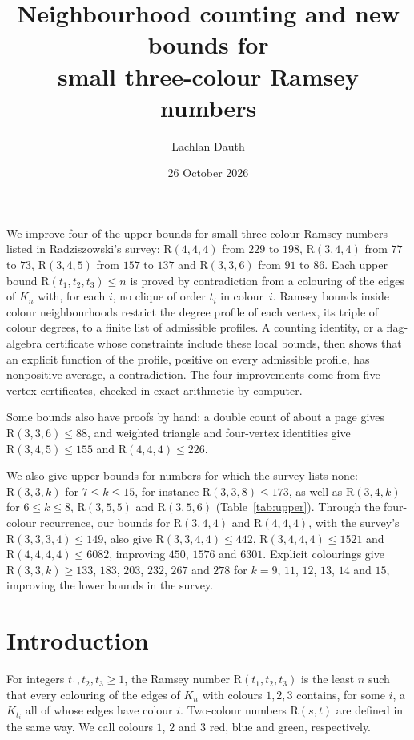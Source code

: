 \documentclass[11pt]{article}
\title{Neighbourhood counting and new bounds for\\ small three-colour Ramsey numbers}
\author{Lachlan Dauth}
\date{26 October 2026}
\renewenvironment{abstract}{\small\begin{center}\bfseries\abstractname\end{center}%
  \list{}{\setlength{\leftmargin}{2.5em}\setlength{\rightmargin}{\leftmargin}%
  \setlength{\listparindent}{0pt}\setlength{\parsep}{0.6em plus 1pt}\setlength{\topsep}{0pt}}\item\relax}{\endlist}
\theoremstyle{spacedplain}
\theoremstyle{spaceddef}
\theoremstyle{spacedremark}
\newcommand{\R}{\mathrm{R}}
\begin{document}
\maketitle

\begin{abstract}
We improve four of the upper bounds for small three-colour Ramsey numbers listed in Radziszowski's survey: $\R(4,4,4)$ from $229$ to $198$, $\R(3,4,4)$ from $77$ to $73$, $\R(3,4,5)$ from $157$ to $137$ and $\R(3,3,6)$ from $91$ to $86$.
Each upper bound $\R(t_1,t_2,t_3)\le n$ is proved by contradiction from a colouring of the edges of $K_n$ with, for each $i$, no clique of order $t_i$ in colour~$i$.
Ramsey bounds inside colour neighbourhoods restrict the degree profile of each vertex, its triple of colour degrees, to a finite list of admissible profiles.
A counting identity, or a flag-algebra certificate whose constraints include these local bounds, then shows that an explicit function of the profile, positive on every admissible profile, has nonpositive average, a contradiction.
The four improvements come from five-vertex certificates, checked in exact arithmetic by computer.

Some bounds also have proofs by hand: a double count of about a page gives $\R(3,3,6)\le 88$, and weighted triangle and four-vertex identities give $\R(3,4,5)\le 155$ and $\R(4,4,4)\le 226$.

We also give upper bounds for numbers for which the survey lists none: $\R(3,3,k)$ for $7\le k\le 15$, for instance $\R(3,3,8)\le 173$, as well as $\R(3,4,k)$ for $6\le k\le 8$, $\R(3,5,5)$ and $\R(3,5,6)$ (Table~\ref{tab:upper}).
Through the four-colour recurrence, our bounds for $\R(3,4,4)$ and $\R(4,4,4)$, with the survey's $\R(3,3,3,4)\le 149$, also give $\R(3,3,4,4)\le 442$, $\R(3,4,4,4)\le 1521$ and $\R(4,4,4,4)\le 6082$, improving $450$, $1576$ and $6301$.
Explicit colourings give $\R(3,3,k)\ge 133$, $183$, $203$, $232$, $267$ and $278$ for $k=9$, $11$, $12$, $13$, $14$ and $15$, improving the lower bounds in the survey.
\end{abstract}

\section{Introduction}

For integers $t_1,t_2,t_3\ge 1$, the Ramsey number $\R(t_1,t_2,t_3)$ is the least $n$ such that every colouring of the edges of $K_n$ with colours $1,2,3$ contains, for some $i$, a $K_{t_i}$ all of whose edges have colour $i$.
Two-colour numbers $\R(s,t)$ are defined in the same way.
We call colours $1$, $2$ and $3$ red, blue and green, respectively.
\end{document}
